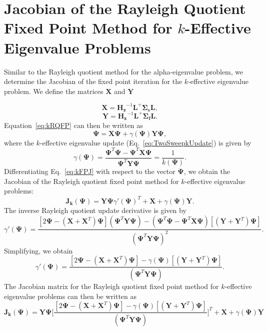\section{Jacobian of the Rayleigh Quotient Fixed Point Method for $k$-Effective Eigenvalue Problems}

Similar to the Rayleigh quotient method for the alpha-eigenvalue problem, we determine the Jacobian of the fixed point iteration for the $k$-effective eigenvalue problem. We define the matrices $\mathbf{X}$ and $\mathbf{Y}$

\begin{equation}
	\mathbf{X} = \mathbf{H_{z}}^{-1} \mathbf{L}^{+} \mathbf{\Sigma_{s}} \mathbf{L},
\end{equation}
\begin{equation}
	\mathbf{Y} = \mathbf{H_{z}}^{-1} \mathbf{L}^{+} \mathbf{\Sigma_{f}} \mathbf{L}.
\end{equation}
Equation~\ref{eq:kRQFP} can then be written as
\begin{equation}
	\mathbf{\Psi} = \mathbf{X\Psi} + \gamma(\mathbf{\Psi}) \mathbf{Y\Psi},
	\label{eq:kFPJ}
\end{equation}
where the $k$-effective eigenvalue update (Eq.~\ref{eq:TwoSweepkUpdate}) is given by
\begin{equation}
	\gamma(\mathbf{\Psi}) = \frac{ \mathbf{\Psi}^{T} \mathbf{\Psi} - \mathbf{\Psi}^{T} \mathbf{X} \mathbf{\Psi}}{\mathbf{\Psi}^{T}\mathbf{Y} \mathbf{\Psi}} = \frac{1}{k(\mathbf{\Psi})}.
\end{equation}
Differentiating Eq.~\ref{eq:kFPJ} with respect to the vector $\mathbf{\Psi}$, we obtain the Jacobian of the Rayleigh quotient fixed point method for $k$-effective eigenvalue problems:
\begin{equation}
	\mathbf{J_{k}}(\mathbf{\Psi}) = \mathbf{Y\Psi} \gamma'(\mathbf{\Psi})^{T} + \mathbf{X} + \gamma(\mathbf{\Psi}) \mathbf{Y}.
\end{equation}
The inverse Rayleigh quotient update derivative is given by
\begin{equation}
	\gamma'(\mathbf{\Psi}) = \frac{[2 \mathbf{\Psi} - (\mathbf{X} + \mathbf{X}^{T}) \mathbf{\Psi}] (\mathbf{\Psi}^{T}\mathbf{Y} \mathbf{\Psi}) - (\mathbf{\Psi}^{T} \mathbf{\Psi} - \mathbf{\Psi}^{T} \mathbf{X} \mathbf{\Psi})[(\mathbf{Y} + \mathbf{Y}^{T})\mathbf{\Psi}]}{(\mathbf{\Psi}^{T} \mathbf{Y} \mathbf{\Psi})^{2}}.
\end{equation}
Simplifying, we obtain
\begin{equation}
	\gamma'(\mathbf{\Psi}) = \frac{[2 \mathbf{\Psi} - (\mathbf{X} + \mathbf{X}^{T}) \mathbf{\Psi}]  -\gamma(\mathbf{\Psi})[(\mathbf{Y} + \mathbf{Y}^{T})\mathbf{\Psi}]}{(\mathbf{\Psi}^{T} \mathbf{Y} \mathbf{\Psi})}.
\end{equation}
The Jacobian matrix for the Rayleigh quotient fixed point method for $k$-effective eigenvalue problems can then be written as
\begin{equation}
	\mathbf{J_{k}}(\mathbf{\Psi}) = \mathbf{Y\Psi} \bigg [ \frac{[2 \mathbf{\Psi} - (\mathbf{X} + \mathbf{X}^{T}) \mathbf{\Psi}]  -\gamma(\mathbf{\Psi})[(\mathbf{Y} + \mathbf{Y}^{T})\mathbf{\Psi}]}{(\mathbf{\Psi}^{T} \mathbf{Y} \mathbf{\Psi})} \bigg] ^{T} + \mathbf{X} + \gamma(\mathbf{\Psi}) \mathbf{Y}
\end{equation}